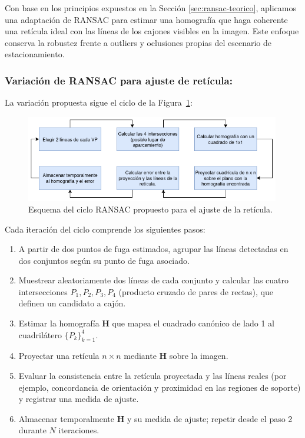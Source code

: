 \noindent
Con base en los principios expuestos en la Sección \ref{sec:ransac-teorico},
aplicamos una adaptación de RANSAC para estimar una homografía que haga coherente una retícula ideal con
las líneas de los cajones visibles en la imagen. Este enfoque conserva la robustez frente a outliers y
oclusiones propias del escenario de estacionamiento.

\subsubsection{Variación de RANSAC para ajuste de retícula:}
\noindent
La variación propuesta sigue el ciclo de la Figura~\ref{fig:ramsac-flujo}:

\begin{figure}[!ht]
    \centering
    \includegraphics[width=0.99\textwidth]{img/3-metodo/ramsac-loop1.png}
    \caption{Esquema del ciclo RANSAC propuesto para el ajuste de la retícula.}
    \label{fig:ramsac-flujo}
\end{figure}

\noindent
Cada iteración del ciclo comprende los siguientes pasos:
\begin{enumerate}
    \item A partir de dos puntos de fuga estimados, agrupar las líneas detectadas en dos conjuntos según su punto de fuga asociado.
    \item Muestrear aleatoriamente dos líneas de cada conjunto y calcular las cuatro intersecciones \(P_1, P_2, P_3, P_4\) (producto cruzado de pares de rectas), que definen un candidato a cajón.
    \item Estimar la homografía \(\mathbf{H}\) que mapea el cuadrado canónico de lado 1 al cuadrilátero \(\{P_k\}_{k=1}^4\).
    \item Proyectar una retícula \(n\times n\) mediante \(\mathbf{H}\) sobre la imagen.
    \item Evaluar la consistencia entre la retícula proyectada y las líneas reales (por ejemplo, concordancia de orientación y proximidad en las regiones de soporte) y registrar una medida de ajuste.
    \item Almacenar temporalmente \(\mathbf{H}\) y su medida de ajuste; repetir desde el paso 2 durante \(N\) iteraciones.
\end{enumerate}

